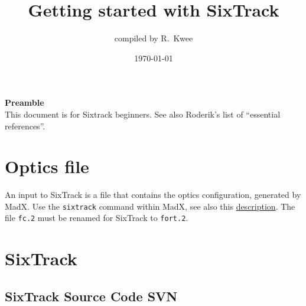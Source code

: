\documentclass[a4paper, oneside, final]{scrartcl}
\begin{document}
\title{Getting started with SixTrack}
\author{\large{compiled by R.~Kwee}}

\date{\large{\today}}
        \maketitle


\setlength{\parindent}{0cm}
{\LARGE{\textbf{Preamble}}}\\

\noindent This document is for Sixtrack beginners. See also Roderik's list of ``essential references''.
\section{Optics file}

An input to SixTrack is a file that contains the optics configuration, generated by MadX. Use the \texttt{sixtrack} command within MadX, see also this {\href{http://frs.home.cern.ch/frs/Xdoc/c6t/c6t.html}{description}}. The file \texttt{fc.2} must be renamed for SixTrack to \texttt{fort.2}.

\section{SixTrack}

\subsection{SixTrack Source Code SVN}
\end{document}
